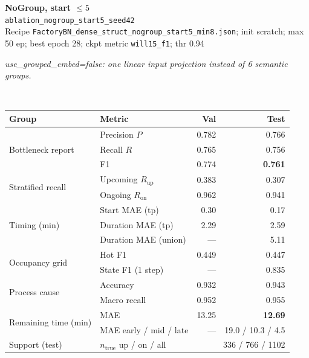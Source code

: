 \documentclass[9pt,a4paper,twocolumn]{extarticle}
\begin{document}
\noindent\begin{minipage}{\columnwidth}
\begin{center}
{\small\bfseries NoGroup, start $\le 5$}\\
{\scriptsize\texttt{ablation\_nogroup\_start5\_seed42}}\\
{\scriptsize Recipe \texttt{FactoryBN\_dense\_struct\_nogroup\_start5\_min8.json}; init scratch; max 50 ep; best epoch 28; ckpt metric \texttt{will15\_f1}; thr 0.94}\\[1pt]
\parbox{0.96\columnwidth}{\scriptsize\itshape use\_grouped\_embed=false: one linear input projection instead of 6 semantic groups.}\\[2pt]
\scriptsize\setlength{\tabcolsep}{3pt}
\begin{tabular}{llrr}
\toprule
Group & Metric & Val & Test \\
\midrule
\multirow{3}{*}{Bottleneck report}
  & Precision $P$ & 0.782 & 0.766 \\
  & Recall $R$ & 0.765 & 0.756 \\
  & F1 & 0.774 & \textbf{0.761} \\
\midrule
\multirow{2}{*}{Stratified recall}
  & Upcoming $R_{\mathrm{up}}$ & 0.383 & 0.307 \\
  & Ongoing $R_{\mathrm{on}}$ & 0.962 & 0.941 \\
\midrule
\multirow{3}{*}{Timing (min)}
  & Start MAE (tp) & 0.30 & 0.17 \\
  & Duration MAE (tp) & 2.29 & 2.59 \\
  & Duration MAE (union) & --- & 5.11 \\
\midrule
\multirow{2}{*}{Occupancy grid}
  & Hot F1 & 0.449 & 0.447 \\
  & State F1 (1 step) & --- & 0.835 \\
\midrule
\multirow{2}{*}{Process cause}
  & Accuracy & 0.932 & 0.943 \\
  & Macro recall & 0.952 & 0.955 \\
\midrule
\multirow{2}{*}{Remaining time (min)}
  & MAE & 13.25 & \textbf{12.69} \\
  & MAE early / mid / late & --- & 19.0 / 10.3 / 4.5 \\
\midrule
Support (test)
  & $n_{\mathrm{true}}$ up / on / all & \multicolumn{2}{r}{336 / 766 / 1102} \\
\bottomrule
\end{tabular}
\end{center}
\end{minipage}\par\vspace{6pt}
\end{document}
